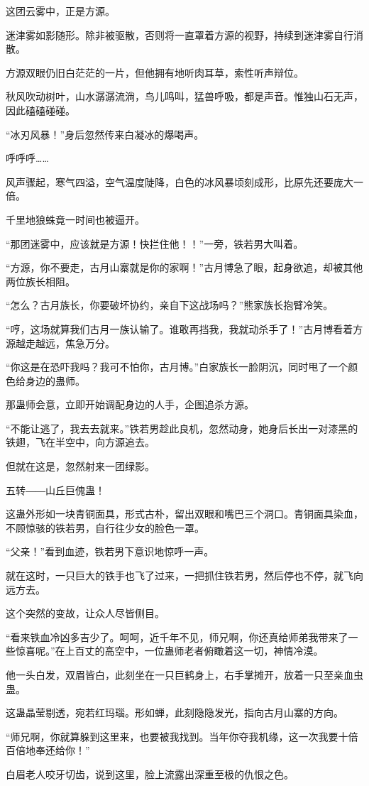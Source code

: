 \begin{this_body}
这团云雾中，正是方源。

迷津雾如影随形。除非被驱散，否则将一直罩着方源的视野，持续到迷津雾自行消散。

方源双眼仍旧白茫茫的一片，但他拥有地听肉耳草，索性听声辩位。

秋风吹动树叶，山水潺潺流淌，鸟儿鸣叫，猛兽呼吸，都是声音。惟独山石无声，因此磕磕碰碰。

“冰刃风暴！”身后忽然传来白凝冰的爆喝声。

呼呼呼……

风声骤起，寒气四溢，空气温度陡降，白色的冰风暴顷刻成形，比原先还要庞大一倍。

千里地狼蛛竟一时间也被逼开。

“那团迷雾中，应该就是方源！快拦住他！！”一旁，铁若男大叫着。

“方源，你不要走，古月山寨就是你的家啊！”古月博急了眼，起身欲追，却被其他两位族长相阻。

“怎么？古月族长，你要破坏协约，亲自下这战场吗？”熊家族长抱臂冷笑。

“哼，这场就算我们古月一族认输了。谁敢再挡我，我就动杀手了！”古月博看着方源越走越远，焦急万分。

“你这是在恐吓我吗？我可不怕你，古月博。”白家族长一脸阴沉，同时甩了一个颜色给身边的蛊师。

那蛊师会意，立即开始调配身边的人手，企图追杀方源。

“不能让逃了，我去去就来。”铁若男趁此良机，忽然动身，她身后长出一对漆黑的铁翅，飞在半空中，向方源追去。

但就在这是，忽然射来一团绿影。

五转――山丘巨傀蛊！

这蛊外形如一块青铜面具，形式古朴，留出双眼和嘴巴三个洞口。青铜面具染血，不顾惊骇的铁若男，自行往少女的脸色一罩。

“父亲！”看到血迹，铁若男下意识地惊呼一声。

就在这时，一只巨大的铁手也飞了过来，一把抓住铁若男，然后停也不停，就飞向远方去。

这个突然的变故，让众人尽皆侧目。

“看来铁血冷凶多吉少了。呵呵，近千年不见，师兄啊，你还真给师弟我带来了一些惊喜呢。”在上百丈的高空中，一位蛊师老者俯瞰着这一切，神情冷漠。

他一头白发，双眉皆白，此刻坐在一只巨鹤身上，右手掌摊开，放着一只至亲血虫蛊。

这蛊晶莹剔透，宛若红玛瑙。形如蝉，此刻隐隐发光，指向古月山寨的方向。

“师兄啊，你就算躲到这里来，也要被我找到。当年你夺我机缘，这一次我要十倍百倍地奉还给你！”

白眉老人咬牙切齿，说到这里，脸上流露出深重至极的仇恨之色。

\end{this_body}

